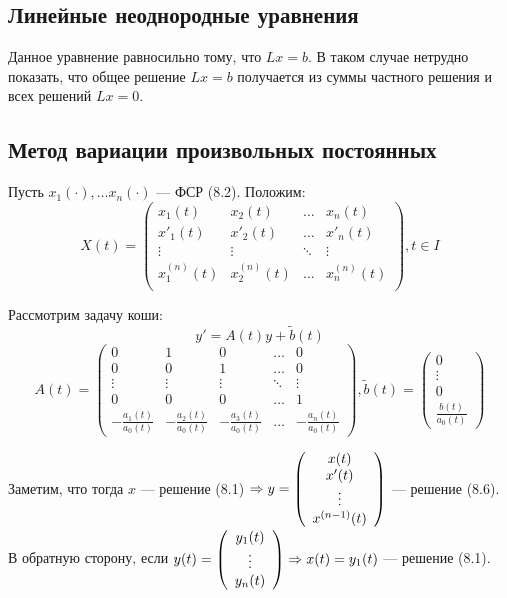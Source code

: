 

\subsection{Линейные неоднородные уравнения}
Данное уравнение равносильно тому, что \(Lx = b\). В таком случае нетрудно показать, что общее решение \(Lx = b\) получается из суммы частного решения и всех решений \(Lx = 0\).

\subsection{Метод вариации произвольных постоянных}
Пусть \(x_1(\cdot), \dots x_n(\cdot)\) --- ФСР (8.2). Положим:
\[X(t) = \left( \begin{array}{cccc}
    x_1(t) & x_2(t) & \dots & x_n(t) \\
    x'_1(t) & x'_2(t) & \dots & x'_n(t) \\
    \vdots & \vdots & \ddots & \vdots \\
    x^{(n)}_1(t) & x^{(n)}_2(t) & \dots & x^{(n)}_n(t) \\
\end{array} \right), t \in I\]

Рассмотрим задачу коши:
\begin{equation}
    y' = A(t)y + \tilde{b}(t)
\end{equation}
\[A(t) = \left( \begin{array}{ccccc}
    0 & 1 & 0 & \dots & 0 \\
    0 & 0 & 1 & \dots & 0 \\
    \vdots & \vdots & \vdots & \ddots & \vdots \\
    0 & 0 & 0 & \dots & 1 \\
    -\frac{a_1(t)}{a_0(t)} & -\frac{a_2(t)}{a_0(t)} & -\frac{a_3(t)}{a_0(t)} & \dots & -\frac{a_n(t)}{a_0(t)}
\end{array} \right), \tilde{b}(t) = \left( \begin{array}{c}
    0 \\
    \vdots \\
    0 \\
    \frac{b(t)}{a_0(t)}
\end{array} \right)\]

Заметим, что тогда \(x\) --- решение (8.1) \(\Rightarrow y = \left( \begin{array}{c}
    x(t) \\
    x'(t) \\
    \vdots \\
    x^{(n - 1)}(t) \\
\end{array} \right)\) --- решение (8.6). В обратную сторону, если \(y(t) = \left( \begin{array}{c}
    y_1(t) \\
    \vdots \\
    y_n(t) \\
\end{array} \right) \Rightarrow x(t) = y_1(t)\) --- решение (8.1). 

